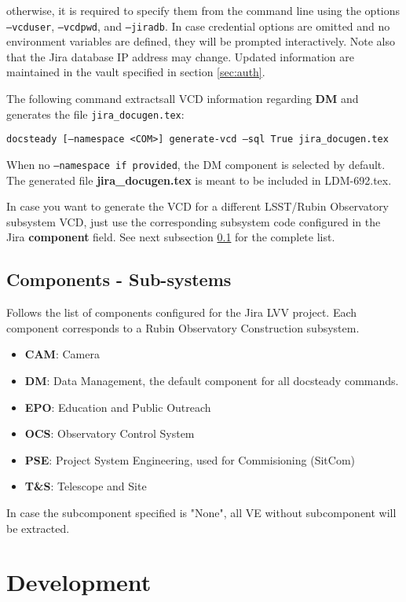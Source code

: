 \documentclass[DM]{lsstdoc}
\begin{document}
otherwise, it is required to specify them from the command line using the options \texttt{--vcduser}, \texttt{--vcdpwd}, and \texttt{--jiradb}.
In case credential options are omitted and no environment variables are defined, they will be prompted interactively.
Note also that the Jira database IP address may change. Updated information are maintained in the vault specified in section \ref{sec:auth}.

The following command extractsall VCD information regarding \textbf{DM} and generates the file \texttt{jira\_docugen.tex}:

\texttt{docsteady [--namespace <COM>] generate-vcd --sql True jira\_docugen.tex}

When no \texttt{--namespace if provided}, the DM component is selected by default.
The generated file \textbf{jira\_docugen.tex} is meant to be included in LDM-692.tex.

In case you want to generate the VCD for a different LSST/Rubin Observatory subsystem VCD,
just use the corresponding subsystem code configured in the Jira \textbf{component} field. 
See next subsection \ref{sec:components} for the complete list.


\subsection{Components - Sub-systems}\label{sec:components}

Follows the list of components configured for the Jira LVV project.
Each component corresponds to a Rubin Observatory Construction subsystem.

\begin{itemize}
\item \textbf{CAM}: Camera
\item \textbf{DM}: Data Management, the default component for all docsteady commands.
\item \textbf{EPO}: Education and Public Outreach
\item \textbf{OCS}: Observatory Control System
\item \textbf{PSE}: Project System Engineering, used for Commisioning (SitCom)
\item \textbf{T\&S}: Telescope and Site
\end{itemize}

In case the subcomponent specified is "None", all VE without subcomponent will be extracted.


\section{Development}
\label{sec:development}
\end{document}
